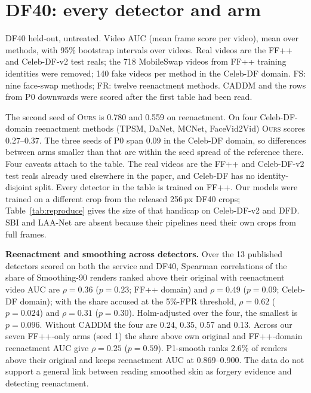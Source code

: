 \documentclass[10pt]{article}
\newcommand{\ours}{\textsc{Ours}}
\begin{document}
\section{DF40: every detector and arm}
\label{sec:df40}
\begin{table}[H]
\centering
\caption{DF40 held-out, untreated. Video AUC (mean frame score per video), mean over methods, with 95\% bootstrap intervals over
videos. Real videos are the FF++ and Celeb-DF-v2 test reals; the 718 MobileSwap videos from FF++ training identities were removed;
140 fake videos per method in the Celeb-DF domain. FS: nine face-swap methods; FR: twelve reenactment methods. CADDM and the rows
from P0 downwards were scored after the first table had been read.}
\label{tab:v4df40full}
\scriptsize
\begin{adjustbox}{max width=\linewidth}\end{adjustbox}
\end{table}
The second seed of \ours{} is 0.780 and 0.559 on reenactment. On four Celeb-DF-domain reenactment methods (TPSM, DaNet, MCNet,
FaceVid2Vid) \ours{} scores 0.27--0.37. The three seeds of P0 span 0.09 in the Celeb-DF domain, so differences between arms smaller
than that are within the seed spread of the reference there. Four caveats attach to the table. The real videos are the FF++ and
Celeb-DF-v2 test reals already used elsewhere in the paper, and Celeb-DF has no identity-disjoint split. Every detector in the table
is trained on FF++. Our models were trained on a different crop from the released 256\,px DF40 crops; Table~\ref{tab:reproduce}
gives the size of that handicap on Celeb-DF-v2 and DFD. SBI and LAA-Net are absent because their pipelines need their own crops from
full frames.

\textbf{Reenactment and smoothing across detectors.} Over the 13 published detectors scored on both the service and DF40, Spearman
correlations of the share of Smoothing-90 renders ranked above their original with reenactment video AUC are $\rho=0.36$
($p=0.23$; FF++ domain) and $\rho=0.49$ ($p=0.09$; Celeb-DF domain); with the share accused at the 5\%-FPR threshold, $\rho=0.62$
($p=0.024$) and $\rho=0.31$ ($p=0.30$). Holm-adjusted over the four, the smallest is $p=0.096$. Without CADDM the four are 0.24,
0.35, 0.57 and 0.13. Across our seven FF++-only arms (seed 1) the share above own original and FF++-domain reenactment AUC give
$\rho=0.25$ ($p=0.59$). P1-smooth ranks 2.6\% of renders above their original and keeps reenactment AUC at 0.869--0.900. The data
do not support a general link between reading smoothed skin as forgery evidence and detecting reenactment.
\end{document}
